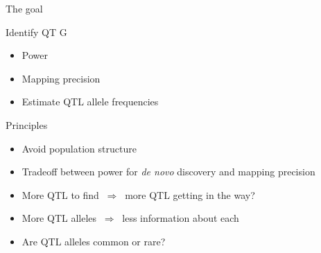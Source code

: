 \documentclass[12pt]{article}
\newcommand{\headsize}{\fontsize{35}{35} \selectfont}
\newcommand{\smallsize}{\fontsize{25}{30} \selectfont}
\newcommand{\smallersize}{\fontsize{20}{25} \selectfont}
\begin{document}
\newpage

\addtocounter{page}{-1}

\headsize \color{myyellow}
\hfill \begin{minipage}{5.75in}
\centering
The goal
\end{minipage}

\vspace{25mm}

\color{mywhite}
\smallsize

\hfill \begin{minipage}{9.5in}
Identify QT{\color{mypink} G}
\end{minipage}

\vspace{15mm}

\hfill \begin{minipage}{9in}
\color{myblue}
\begin{itemize}
\itemsep24pt
\item Power
\item Mapping precision
\item Estimate QTL allele frequencies
\end{itemize}
\end{minipage}


\newpage


\headsize \color{myyellow}
\hfill \begin{minipage}{5.75in}
\centering
Principles
\end{minipage}

\vspace{25mm}

\color{mywhite}
\smallersize

\hfill \begin{minipage}{10in}
\begin{itemize}
\itemsep24pt
\item Avoid population structure
\item Tradeoff between {\color{myblue} power for \emph{de novo\/} discovery}
  and {\color{myblue} mapping precision}
\item More QTL to find $ \ \Rightarrow \ $ more QTL getting in the way?
\item More QTL alleles $ \ \Rightarrow \ $ less information about each
\item Are QTL alleles common or rare?
\end{itemize}
\end{minipage}



\newpage
\end{document}
